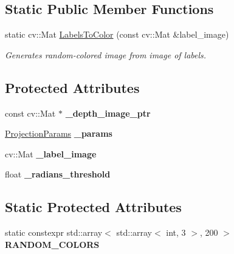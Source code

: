 \subsection*{Static Public Member Functions}
\begin{DoxyCompactItemize}
\item 
static cv\+::\+Mat \hyperlink{classdepth__clustering_1_1AbstractImageLabeler_abab18e0c1ca40b54922a2f21948b996b}{Labels\+To\+Color} (const cv\+::\+Mat \&label\+\_\+image)
\begin{DoxyCompactList}\small\item\em Generates random-\/colored image from image of labels. \end{DoxyCompactList}\end{DoxyCompactItemize}
\subsection*{Protected Attributes}
\begin{DoxyCompactItemize}
\item 
\mbox{\label{classdepth__clustering_1_1AbstractImageLabeler_adb50d2beeba4e4eac26b5ace9304728b}} 
const cv\+::\+Mat $\ast$ {\bfseries \+\_\+depth\+\_\+image\+\_\+ptr}
\item 
\mbox{\label{classdepth__clustering_1_1AbstractImageLabeler_a25fcaead9f8806fa75ad44c669e2a518}} 
\hyperlink{classdepth__clustering_1_1ProjectionParams}{Projection\+Params} {\bfseries \+\_\+params}
\item 
\mbox{\label{classdepth__clustering_1_1AbstractImageLabeler_aeabb8ac8238c684066f8c0edcca9b807}} 
cv\+::\+Mat {\bfseries \+\_\+label\+\_\+image}
\item 
\mbox{\label{classdepth__clustering_1_1AbstractImageLabeler_a1a338d254a41ba94bd4122aa006fbe57}} 
float {\bfseries \+\_\+radians\+\_\+threshold}
\end{DoxyCompactItemize}
\subsection*{Static Protected Attributes}
\begin{DoxyCompactItemize}
\item 
\mbox{\label{classdepth__clustering_1_1AbstractImageLabeler_a24ea9d1c40b872189a9e93f369ae34b2}} 
static constexpr std\+::array$<$ std\+::array$<$ int, 3 $>$, 200 $>$ {\bfseries R\+A\+N\+D\+O\+M\+\_\+\+C\+O\+L\+O\+RS}
\end{DoxyCompactItemize}


